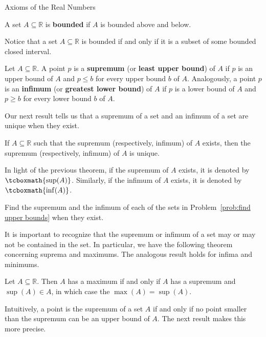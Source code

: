 \begin{section}{Axioms of the Real Numbers}
\begin{definition}
A set $A\subseteq \mathbb{R}$ is \textbf{bounded} if $A$ is bounded above and below.
\end{definition}

Notice that a set $A\subseteq\mathbb{R}$ is bounded if and only if it is a subset of some bounded closed interval.

\begin{definition}
Let $A\subseteq \mathbb{R}$. A point $p$ is a \textbf{supremum} (or \textbf{least upper bound}) of $A$ if $p$ is an upper bound of $A$ and $p\leq b$ for every upper bound $b$ of $A$.  Analogously, a point $p$ is an \textbf{infimum} (or \textbf{greatest lower bound}) of $A$ if $p$ is a lower bound of $A$ and $p\geq b$ for every lower bound $b$ of $A$. 
\end{definition}

Our next result tells us that a supremum of a set and an infimum of a set are unique when they exist.

\begin{theorem}
If $A\subseteq \mathbb{R}$ such that the supremum (respectively, infimum) of $A$ exists, then the supremum (respectively, infimum) of $A$ is unique.
\end{theorem}

In light of the previous theorem, if the supremum of $A$ exists, it is denoted by $\tcboxmath{\sup(A)}$. Similarly, if the infimum of $A$ exists, it is denoted by $\tcboxmath{\inf(A)}$. 

\begin{problem}
Find the supremum and the infimum of each of the sets in Problem~\ref{prob:find upper bounds} when they exist.
\end{problem}

It is important to recognize that the supremum or infimum of a set may or may not be contained in the set. In particular, we have the following theorem concerning suprema and maximums. The analogous result holds for infima and minimums.

\begin{theorem}
Let $A\subseteq \mathbb{R}$. Then $A$ has a maximum if and only if $A$ has a supremum and $\sup(A)\in A$, in which case the $\max(A)=\sup(A)$.
\end{theorem}

Intuitively, a point is the supremum of a set $A$ if and only if no point smaller than the supremum can be an upper bound of $A$. The next result makes this more precise.


\end{section}
